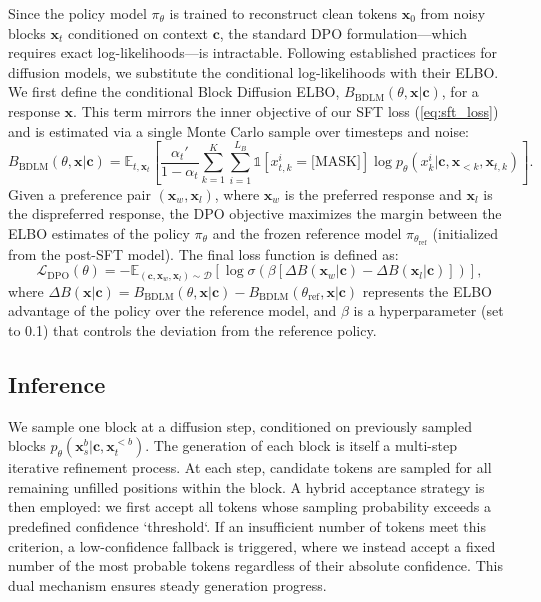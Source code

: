 Since the policy model $\pi_{\theta}$ is trained to reconstruct clean tokens $\bm{x}_0$ from noisy blocks $\bm{x}_t$ conditioned on context $\bm{c}$, the standard DPO formulation—which requires exact log-likelihoods—is intractable. Following established practices for diffusion models, we substitute the conditional log-likelihoods with their ELBO. 
We first define the conditional Block Diffusion ELBO, $B_{\text{BDLM}}(\theta, \boldsymbol{x} | \boldsymbol{c})$, for a response $\boldsymbol{x}$. This term mirrors the inner objective of our SFT loss (\eqref{eq:sft_loss}) and is estimated via a single Monte Carlo sample over timesteps and noise:
\begin{equation}\label{eq:bdlm_elbo}
    B_{\text{BDLM}}(\theta, \boldsymbol{x} | \boldsymbol{c}) = \mathbb{E}_{t, \bm{x}_t} \left[ \frac{\alpha_{t}'}{1-\alpha_{t}}\sum_{k=1}^{K} \sum_{i=1}^{L_B} \mathbb{1}[x_{t,k}^i=\text{[MASK]}] \log p_{\theta}(x^i_{k} | \boldsymbol{c}, \boldsymbol{x}_{<k}, \boldsymbol{x}_{t,k}) \right].
\end{equation}
Given a preference pair $(\boldsymbol{x}_w, \boldsymbol{x}_l)$, where $\boldsymbol{x}_w$ is the preferred response and $\boldsymbol{x}_l$ is the dispreferred response, the DPO objective maximizes the margin between the ELBO estimates of the policy $\pi_{\theta}$ and the frozen reference model $\pi_{\theta_{\text{ref}}}$ (initialized from the post-SFT model). The final loss function is defined as:
\begin{equation}\label{eq:dpo_loss}
\mathcal{L}_{\text{DPO}}(\theta) = - \mathbb{E}_{(\boldsymbol{c}, \boldsymbol{x}_w, \boldsymbol{x}_l) \sim \mathcal{D}} \left[ \log \sigma \left( \beta \left[ \Delta B(\boldsymbol{x}_w | \boldsymbol{c}) - \Delta B(\boldsymbol{x}_l | \boldsymbol{c}) \right] \right) \right],
\end{equation}
where $\Delta B(\boldsymbol{x} | \boldsymbol{c}) = B_{\text{BDLM}}(\theta, \boldsymbol{x} | \boldsymbol{c}) - B_{\text{BDLM}}(\theta_{\text{ref}}, \boldsymbol{x} | \boldsymbol{c})$ represents the ELBO advantage of the policy over the reference model, and $\beta$ is a hyperparameter (set to 0.1) that controls the deviation from the reference policy.

\subsection{Inference}
We sample one block at a diffusion step, conditioned on previously sampled blocks $p_{\theta}(\bm{x}^{b}_{s}|\bm{c},\bm{x}^{<b}_{t})$. The generation of each block is itself a multi-step iterative refinement process. At each step, candidate tokens are sampled for all remaining unfilled positions within the block. A hybrid acceptance strategy is then employed: we first accept all tokens whose sampling probability exceeds a predefined confidence `threshold`. If an insufficient number of tokens meet this criterion, a low-confidence fallback is triggered, where we instead accept a fixed number of the most probable tokens regardless of their absolute confidence. This dual mechanism ensures steady generation progress.

